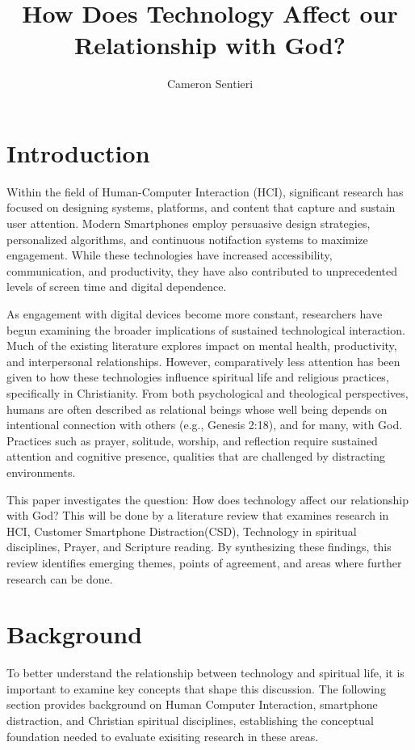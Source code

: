 \documentclass[12pt]{article}
\title{\textbf{How Does Technology Affect our Relationship with God?}}
\author{Cameron Sentieri}
\begin{document}
\maketitle

\section{Introduction}
Within the field of Human-Computer Interaction (HCI), significant research has focused on designing systems, platforms, and content that capture and sustain user attention. Modern Smartphones employ persuasive design strategies, personalized algorithms, and continuous notifaction systems to maximize engagement. While these technologies have increased accessibility, communication, and productivity, they have also contributed to unprecedented levels of screen time and digital dependence. 

As engagement with digital devices become more constant, researchers have begun examining the broader implications of sustained technological interaction. Much of the existing literature explores impact on mental health, productivity, and interpersonal relationships. However, comparatively less attention has been given to how these technologies influence spiritual life and religious practices, specifically in Christianity. From both psychological and theological perspectives, humans are often described as relational beings whose well being depends on intentional connection with others (e.g., Genesis 2:18), and for many, with God. Practices such as prayer, solitude, worship, and reflection require sustained attention and cognitive presence, qualities that are challenged by distracting environments.

This paper investigates the question: How does technology affect our relationship with God? This will be done by a literature review that examines research in HCI, Customer Smartphone Distraction(CSD), Technology in spiritual disciplines, Prayer, and Scripture reading. By synthesizing these findings, this review identifies emerging themes, points of agreement, and areas where further research can be done. 
\section{Background}

To better understand the relationship between technology and spiritual life, it is important to examine key concepts that shape this discussion. The following section provides background on Human Computer Interaction, smartphone distraction, and Christian spiritual disciplines, establishing the conceptual foundation needed to evaluate exisiting research in these areas.
\end{document}
